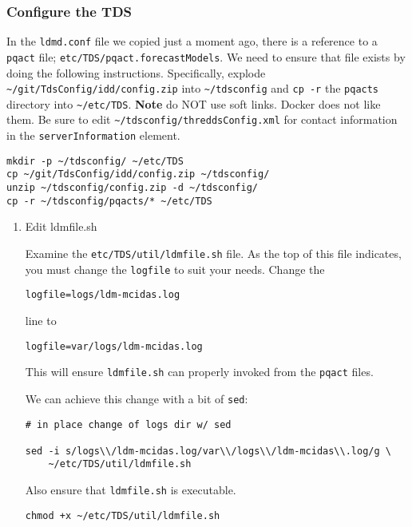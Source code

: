 \documentclass[onecolumn,9pt]{article}
\begin{document}
\subsubsection{Configure the TDS}
\label{sec:orgheadline24}

In the \texttt{ldmd.conf} file we copied just a moment ago, there is a reference to a \texttt{pqact} file; \texttt{etc/TDS/pqact.forecastModels}. We need to ensure that file exists by doing the following instructions. Specifically, explode \texttt{\textasciitilde{}/git/TdsConfig/idd/config.zip} into \texttt{\textasciitilde{}/tdsconfig} and \texttt{cp -r} the \texttt{pqacts} directory into \texttt{\textasciitilde{}/etc/TDS}. \textbf{Note} do NOT use soft links. Docker does not like them. Be sure to edit \texttt{\textasciitilde{}/tdsconfig/threddsConfig.xml} for contact information in the \texttt{serverInformation} element.

\begin{verbatim}
mkdir -p ~/tdsconfig/ ~/etc/TDS
cp ~/git/TdsConfig/idd/config.zip ~/tdsconfig/
unzip ~/tdsconfig/config.zip -d ~/tdsconfig/
cp -r ~/tdsconfig/pqacts/* ~/etc/TDS
\end{verbatim}

\begin{enumerate}
\item Edit ldmfile.sh
\label{sec:orgheadline23}

Examine the \texttt{etc/TDS/util/ldmfile.sh} file. As the top of this file indicates, you must change the \texttt{logfile} to suit your needs. Change the 

\begin{verbatim}
logfile=logs/ldm-mcidas.log
\end{verbatim}

line to

\begin{verbatim}
logfile=var/logs/ldm-mcidas.log
\end{verbatim}

This will ensure \texttt{ldmfile.sh} can properly invoked from the \texttt{pqact} files.

We can achieve this change with a bit of \texttt{sed}:

\begin{verbatim}
# in place change of logs dir w/ sed

sed -i s/logs\\/ldm-mcidas.log/var\\/logs\\/ldm-mcidas\\.log/g \
    ~/etc/TDS/util/ldmfile.sh
\end{verbatim}

Also ensure that \texttt{ldmfile.sh} is executable.

\begin{verbatim}
chmod +x ~/etc/TDS/util/ldmfile.sh
\end{verbatim}
\end{enumerate}
\end{document}
